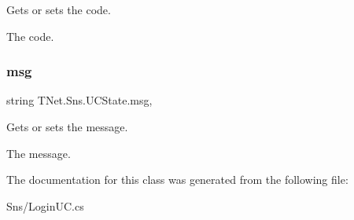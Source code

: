 Gets or sets the code. 

The code.\mbox{\label{class_t_net_1_1_sns_1_1_u_c_state_a945c75079f800f326cf231d96c17c4ed}} 
\subsubsection{\texorpdfstring{msg}{msg}}
{\footnotesize\ttfamily string T\+Net.\+Sns.\+U\+C\+State.\+msg\hspace{0.3cm}{\ttfamily [get]}, {\ttfamily [set]}}



Gets or sets the message. 

The message.

The documentation for this class was generated from the following file\+:\begin{DoxyCompactItemize}
\item 
Sns/Login\+U\+C.\+cs\end{DoxyCompactItemize}
